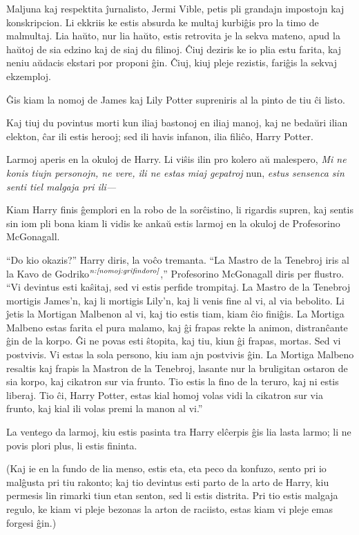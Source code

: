 Maljuna kaj respektita ĵurnalisto, Jermi Vible, petis pli grandajn
impostojn kaj konskripcion. Li ekkriis ke estis absurda ke multaj
kurbiĝis pro la timo de malmultaj. Lia haŭto, nur lia haŭto, estis
retrovita je la sekva mateno, apud la haŭtoj de sia edzino kaj de siaj
du filinoj. Ĉiuj deziris ke io plia estu farita, kaj neniu aŭdacis
ekstari por proponi ĝin. Ĉiuj, kiuj pleje rezistis, fariĝis la sekvaj
ekzemploj.

Ĝis kiam la nomoj de James kaj Lily Potter supreniris al la pinto de
tiu ĉi listo.

Kaj tiuj du povintus morti kun iliaj bastonoj en iliaj manoj, kaj ne
bedaŭri ilian elekton, ĉar ili estis herooj; sed ili havis infanon,
ilia filiĉo, Harry Potter.

Larmoj aperis en la okuloj de Harry. Li viŝis ilin pro kolero aŭ
malespero, \emph{Mi ne konis tiujn personojn, ne vere, ili ne estas
miaj gepatroj} nun, \emph{estus sensenca sin senti tiel malgaja pri
ili—}

Kiam Harry finis ĝemplori en la robo de la sorĉistino, li rigardis
supren, kaj sentis sin iom pli bona kiam li vidis ke ankaŭ estis
larmoj en la okuloj de Profesorino McGonagall.

``Do kio okazis?'' Harry diris, la voĉo tremanta.  ``La Mastro de la
Tenebroj iris al la Kavo de Godriko$^{\textit{n:\ref{nomoj:grifindoro}}}$,''
Profesorino McGonagall diris per flustro. ``Vi devintus esti kaŝitaj,
sed vi estis perfide trompitaj. La Mastro de la Tenebroj mortigis
James'n, kaj li mortigis Lily'n, kaj li venis fine al vi, al via
bebolito. Li ĵetis la Mortigan Malbenon al vi, kaj tio estis tiam, kiam
ĉio finiĝis. La Mortiga Malbeno estas farita el pura malamo, kaj ĝi
frapas rekte la animon, distranĉante ĝin de la korpo. Ĝi ne povas esti
ŝtopita, kaj tiu, kiun ĝi frapas, mortas. Sed vi postvivis. Vi estas
la sola persono, kiu iam ajn postvivis ĝin. La Mortiga Malbeno
resaltis kaj frapis la Mastron de la Tenebroj, lasante nur la bruligitan
ostaron de sia korpo, kaj cikatron sur via frunto. Tio estis la fino
de la teruro, kaj ni estis liberaj. Tio ĉi, Harry Potter, estas kial homoj
volas vidi la cikatron sur via frunto, kaj kial ili volas premi la
manon al vi.''

La ventego da larmoj, kiu estis pasinta tra Harry elĉerpis ĝis lia
lasta larmo; li ne povis plori plus, li estis fininta.

(Kaj ie en la fundo de lia menso, estis eta, eta peco da konfuzo,
sento pri io malĝusta pri tiu rakonto; kaj tio devintus esti parto de
la arto de Harry, kiu permesis lin rimarki tiun etan senton, sed li
estis distrita. Pri tio estis malgaja regulo, ke kiam vi pleje bezonas
la arton de raciisto, estas kiam vi pleje emas forgesi ĝin.)

